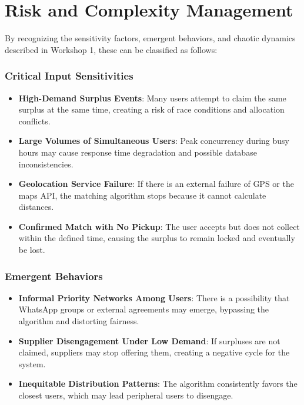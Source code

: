 \documentclass[conference]{IEEEtran}
\begin{document}
\section{Risk and Complexity Management}

By recognizing the sensitivity factors, emergent behaviors, and chaotic dynamics described in Workshop 1, these can be classified as follows:

\subsubsection{Critical Input Sensitivities}

\begin{itemize}
    \item \textbf{High-Demand Surplus Events}: Many users attempt to claim the same surplus at the same time, creating a risk of race conditions and allocation conflicts.
    \item \textbf{Large Volumes of Simultaneous Users}: Peak concurrency during busy hours may cause response time degradation and possible database inconsistencies.
    \item \textbf{Geolocation Service Failure}: If there is an external failure of GPS or the maps API, the matching algorithm stops because it cannot calculate distances.
    \item \textbf{Confirmed Match with No Pickup}: The user accepts but does not collect within the defined time, causing the surplus to remain locked and eventually be lost.
\end{itemize}

\subsubsection{Emergent Behaviors}

\begin{itemize}
    \item \textbf{Informal Priority Networks Among Users}: There is a possibility that WhatsApp groups or external agreements may emerge, bypassing the algorithm and distorting fairness.
    \item \textbf{Supplier Disengagement Under Low Demand}: If surpluses are not claimed, suppliers may stop offering them, creating a negative cycle for the system.
    \item \textbf{Inequitable Distribution Patterns}: The algorithm consistently favors the closest users, which may lead peripheral users to disengage.
\end{itemize}
\end{document}

